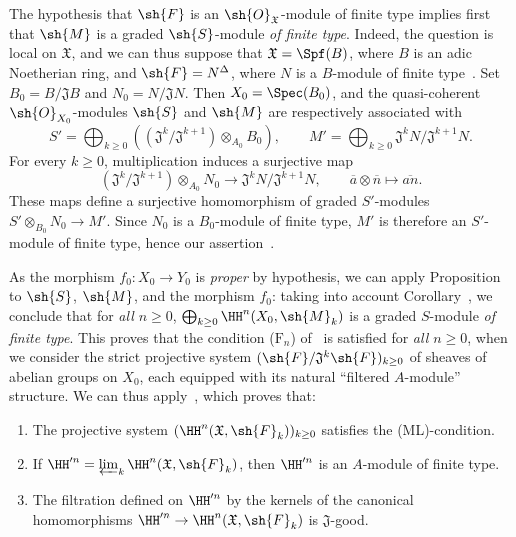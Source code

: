 The hypothesis that $\sh{F}$ is an $\sh{O}_\mathfrak{X}$-module of finite type implies first that $\sh{M}$ is
a graded $\sh{S}$-module \emph{of finite type}.
Indeed, the question is local on $\mathfrak{X}$, and we can thus suppose that $\mathfrak{X}=\Spf(B)$, where $B$ is an adic Noetherian ring, and $\sh{F}=N^\Delta$, where $N$ is a $B$-module of finite type~.
Set $B_0=B/\mathfrak{J}B$ and $N_0=N/\mathfrak{J}N$.
Then $X_0=\Spec(B_0)$, and the quasi-coherent $\sh{O}_{X_0}$-modules $\sh{S}$ and $\sh{M}$ are respectively associated with
\[
  S'=\bigoplus_{k\geq 0}((\mathfrak{J}^k/\mathfrak{J}^{k+1})\otimes_{A_0}B_0),\qquad
  M'=\bigoplus_{k\geq 0}\mathfrak{J}^kN/\mathfrak{J}^{k+1}N.
\]
For every $k\geq 0$, multiplication induces a surjective map
\[
  (\mathfrak{J}^k/\mathfrak{J}^{k+1})\otimes_{A_0}N_0
  \longrightarrow\mathfrak{J}^kN/\mathfrak{J}^{k+1}N,
  \qquad \overline a\otimes\overline n\longmapsto\overline{an}.
\]
These maps define a surjective homomorphism of graded $S'$-modules $S'\otimes_{B_0}N_0\longrightarrow M'$.
Since $N_0$ is a $B_0$-module of finite type, $M'$ is therefore an $S'$-module of finite type, hence our assertion~.

As the morphism $f_0:X_0\to Y_0$ is \emph{proper} by hypothesis, we can apply Proposition~ to $\sh{S}$, $\sh{M}$, and the morphism $f_0$: taking into account Corollary~, we conclude that for \emph{all $n\geq 0$}, $\bigoplus_{k\geq 0}\HH^n(X_0,\sh{M}_k)$ is a graded $S$-module \emph{of finite type}.
This proves that the condition ($\text{F}_n$) of~ is satisfied for \emph{all $n\geq 0$}, when we consider the strict projective system $(\sh{F}/\mathfrak{J}^k\sh{F})_{k\geq 0}$ of sheaves of abelian groups on $X_0$, each equipped with its natural ``filtered $A$-module'' structure.
We can thus apply~, which proves that:
\begin{enumerate}
  \item[1st.] The projective system $(\HH^n(\mathfrak{X},\sh{F}_k))_{k\geq 0}$ satisfies the (ML)-condition.
  \item[2nd.] If $\HH^{\prime n}=\varprojlim_k\HH^n(\mathfrak{X},\sh{F}_k)$, then $\HH^{\prime n}$ is an $A$-module of finite type.
  \item[3rd.] The filtration defined on $\HH^{\prime n}$ by the kernels of the canonical homomorphisms $\HH^{\prime n}\to\HH^n(\mathfrak{X},\sh{F}_k)$ is $\mathfrak{J}$-good.
\end{enumerate}

